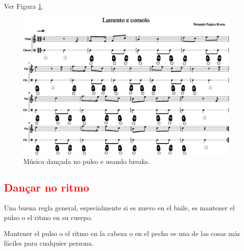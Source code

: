Ver Figura \ref{fig:lamentoconsolopulsobreak1}.
\begin{figure}
    \centering
    \includegraphics[width=\textwidth]{chapters/cap-musica-musicalidade/lamento-e-consolo-clave-pulso+break-1.eps}
    \caption{Música dançada no pulso e usando breaks.}
    \label{fig:lamentoconsolopulsobreak1}
\end{figure}


\subsection{\textcolor{red}{Dançar no ritmo}}
Una buena regla general, especialmente si es nuevo en el baile, es mantener el pulso o el ritmo en su cuerpo.

Mantener el pulso o el ritmo en la cabeza o en el pecho es una de las cosas más fáciles para cualquier persona.

